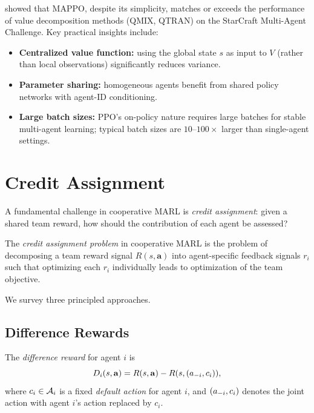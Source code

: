 \documentclass[11pt,a4paper]{article}
\begin{document}
\begin{rlconnection}[title={MAPPO on SMAC}]
\citet{yu2022} showed that MAPPO, despite its simplicity,
matches or exceeds the performance of value decomposition methods
(QMIX, QTRAN) on the StarCraft Multi-Agent Challenge.  Key
practical insights include:
\begin{itemize}[nosep]
  \item \textbf{Centralized value function:} using the global
    state $s$ as input to $V$ (rather than local observations)
    significantly reduces variance.
  \item \textbf{Parameter sharing:} homogeneous agents benefit
    from shared policy networks with agent-ID conditioning.
  \item \textbf{Large batch sizes:} PPO's on-policy nature
    requires large batches for stable multi-agent learning;
    typical batch sizes are $10$--$100\times$ larger than
    single-agent settings.
\end{itemize}
\end{rlconnection}

\section{Credit Assignment}
\label{sec:credit}

A fundamental challenge in cooperative MARL is \emph{credit
assignment}: given a shared team reward, how should the
contribution of each agent be assessed?

\begin{definition}
\label{def:credit}
The \emph{credit assignment problem} in cooperative MARL is the
problem of decomposing a team reward signal $R(s, \mathbf{a})$
into agent-specific feedback signals $r_i$ such that optimizing
each $r_i$ individually leads to optimization of the team objective.
\end{definition}

We survey three principled approaches.

\subsection{Difference Rewards}

\begin{definition}
\label{def:diff-reward}
The \emph{difference reward} for agent $i$ is
\begin{equation}
\label{eq:diff-reward}
  D_i(s, \mathbf{a}) = R(s, \mathbf{a})
  - R(s, (a_{-i}, c_i)),
\end{equation}
where $c_i \in \mathcal{A}_i$ is a fixed \emph{default action}
for agent $i$, and $(a_{-i}, c_i)$ denotes the joint action
with agent $i$'s action replaced by $c_i$.
\end{definition}
\end{document}
